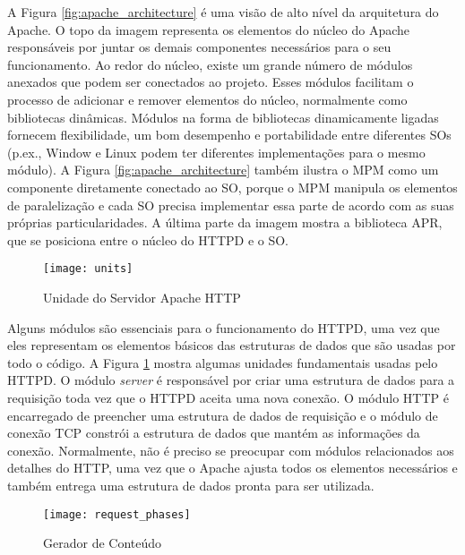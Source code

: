 A Figura \ref{fig:apache_architecture} é uma visão de alto nível da arquitetura
do Apache. O topo da imagem representa os elementos do núcleo do Apache
responsáveis por juntar os demais componentes necessários para o seu
funcionamento. Ao redor do núcleo, existe um grande número de módulos anexados
que podem ser conectados ao projeto. Esses módulos facilitam o processo de
adicionar e remover elementos do núcleo, normalmente como bibliotecas
dinâmicas. Módulos na forma de bibliotecas dinamicamente ligadas fornecem
flexibilidade, um bom desempenho e portabilidade entre diferentes SOs (p.ex.,
Window e Linux podem ter diferentes implementações para o mesmo módulo). A
Figura \ref{fig:apache_architecture} também ilustra o MPM como um componente
diretamente conectado ao SO, porque o MPM manipula os elementos de
paralelização e cada SO precisa implementar essa parte de acordo com as suas
próprias particularidades. A última parte da imagem mostra a biblioteca APR,
que se posiciona entre o núcleo do HTTPD e o SO.

\begin{figure}[!h]
  \centering
  \texttt{[image: units]} 
  \caption{Unidade do Servidor Apache HTTP}
  \label{fig:units} 
\end{figure}

Alguns módulos são essenciais para o funcionamento do HTTPD, uma vez que eles
representam os elementos básicos das estruturas de dados que são usadas por
todo o código. A Figura \ref{fig:units} mostra algumas unidades fundamentais
usadas pelo HTTPD. O módulo \emph{server} é responsável por criar uma estrutura de
dados para a requisição toda vez que o HTTPD aceita uma nova conexão. O módulo
HTTP é encarregado de preencher uma estrutura de dados de requisição e o
módulo de conexão TCP constrói a estrutura de dados que mantém as informações
da conexão. Normalmente, não é preciso se preocupar com módulos relacionados
aos detalhes do HTTP, uma vez que o Apache ajusta todos os elementos necessários
e também entrega uma estrutura de dados pronta para ser utilizada.

\begin{figure}[!h]
  \centering
  \texttt{[image: request\_phases]} 
	\caption[Gerador de Conteúdo]{Gerador de Conteúdo \citep{apache_module_book}}
  \label{fig:content_generator} 
\end{figure}

